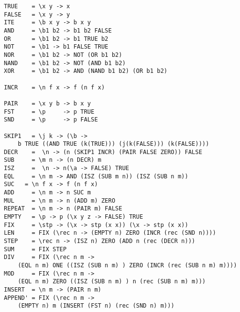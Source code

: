 \documentclass[landscape,8pt]{extarticle}
\begin{document}
\begin{multicols}{3}
\begin{itemize}
\begin{lstlisting}
TRUE    = \x y -> x
FALSE   = \x y -> y
ITE     = \b x y -> b x y
AND     = \b1 b2 -> b1 b2 FALSE
OR      = \b1 b2 -> b1 TRUE b2
NOT     = \b1 -> b1 FALSE TRUE
NOR     = \b1 b2 -> NOT (OR b1 b2)
NAND    = \b1 b2 -> NOT (AND b1 b2)
XOR     = \b1 b2 -> AND (NAND b1 b2) (OR b1 b2)

INCR    = \n f x -> f (n f x)

PAIR    = \x y b -> b x y
FST     = \p     -> p TRUE
SND     = \p     -> p FALSE

SKIP1   = \j k -> (\b ->
    b TRUE ((AND TRUE (k(TRUE))) (j(k(FALSE))) (k(FALSE))))
DECR    =  \n -> (n (SKIP1 INCR) (PAIR FALSE ZERO)) FALSE
SUB     = \m n -> (n DECR) m
ISZ     =  \n -> n(\a -> FALSE) TRUE
EQL     = \n m -> AND (ISZ (SUB m n)) (ISZ (SUB n m))
SUC   = \n f x -> f (n f x)
ADD     = \n m -> n SUC m
MUL     = \n m -> n (ADD m) ZERO
REPEAT  = \n m -> n (PAIR m) FALSE
EMPTY   = \p -> p (\x y z -> FALSE) TRUE
FIX     = \stp -> (\x -> stp (x x)) (\x -> stp (x x))
LEN     = FIX (\rec n -> (EMPTY n) ZERO (INCR (rec (SND n))))
STEP    = \rec n -> (ISZ n) ZERO (ADD n (rec (DECR n)))
SUM     = FIX STEP
DIV     = FIX (\rec n m ->
    (EQL n m) ONE ((ISZ (SUB n m) ) ZERO (INCR (rec (SUB n m) m))))
MOD     = FIX (\rec n m ->
    (EQL n m) ZERO ((ISZ (SUB n m) ) n (rec (SUB n m) m)))
INSERT  = \n m -> (PAIR n m)
APPEND' = FIX (\rec n m ->
    (EMPTY n) m (INSERT (FST n) (rec (SND n) m)))
            \end{lstlisting}
        \end{itemize}


\end{multicols}
\end{document}
